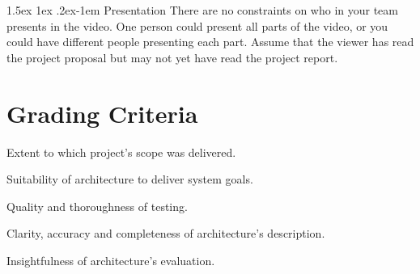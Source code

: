 \documentclass{csse4400}
\makeatletter
\renewcommand{\paragraph}{%
  \@startsection{paragraph}{4}%
  {\z@}{1.5ex \@plus 1ex \@minus .2ex}{-1em}%
  {\normalfont\normalsize\bfseries}%
}
\makeatother
\begin{document}
\paragraph{Presentation} There are no constraints on who in your team presents in the video.
One person could present all parts of the video, or you could have different people presenting each part.
Assume that the viewer has read the project proposal but may not yet have read the project report.

%


\section{Grading Criteria}

\begin{description}[itemsep=3pt]
    \item[20\%] Extent to which project's scope was delivered.
    \item[15\%] Suitability of architecture to deliver system goals.
    \item[20\%] Quality and thoroughness of testing.
    \item[25\%] Clarity, accuracy and completeness of architecture's description.
    \item[20\%] Insightfulness of architecture's evaluation.
\end{description}







\end{document}
